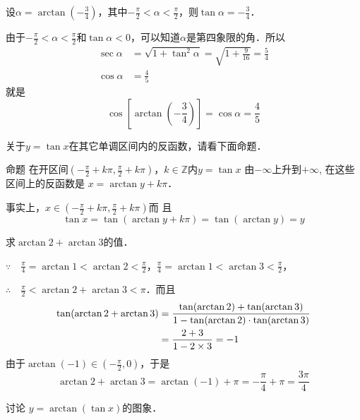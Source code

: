 \begin{solution}
设$\alpha=\arctan\left(-\frac{3}{4}\right)$，其中$-\frac{\pi}{2}<\alpha<\frac{\pi}{2}$，则$\tan\alpha=-\frac{3}{4}$．

由于$-\frac{\pi}{2}<\alpha<\frac{\pi}{2}$和$\tan\alpha<0$，可以知道$\alpha$是第四象限的角．所以
\[\begin{split}
    \sec\alpha&=\sqrt{1+\tan^2\alpha}=\sqrt{1+\frac{9}{16}}=\frac{5}{4}\\
    \cos\alpha&=\frac{4}{5}
\end{split}\]
就是
\[\cos\left[\arctan\left(-\frac{3}{4}\right)\right]=\cos\alpha=\frac{4}{5}\]
\end{solution}

关于$y=\tan x$在其它单调区间内的反函数，请看下面命题．

\begin{blk}{命题}
    在开区间$\left(-\frac{\pi}{2}+k\pi ,\frac{\pi}{2}+k\pi 
\right)$，$k\in\mathbb{Z}$内$y=\tan x$
由$-\infty$上升到$+\infty$, 在这些区间上的反函数是
$x=\arctan y+k\pi$．
\end{blk}

事实上，$x\in \left(-\frac{\pi}{2}+k\pi ,\frac{\pi}{2}+k\pi 
\right)$而
且
\[\tan x=\tan (\arctan y+k\pi )=\tan (\arctan y)=y\]




\begin{example}
    求$\arctan 2+\arctan 3$的值．
\end{example}

\begin{solution}
    $\because\quad \frac{\pi}{4}=\arctan 1<\arctan 2<\frac{\pi}{2}$，$\frac{\pi}{4}=\arctan 1<\arctan 3<\frac{\pi}{2}$，

    $\therefore\quad \frac{\pi}{2}<\arctan 2+\arctan 3<\pi$．而且
\[\begin{split}
    \tan(\arctan 2+\arctan 3)&=\dfrac{\tan (\arctan 2)+\tan (\arctan  3)}{1-\tan(\arctan 2)\cdot \tan (\arctan 3)}\\
    &=\dfrac{2+3}{1-2\times 3}=-1
\end{split}\]
由于$\arctan (-1)\in \left(-\frac{\pi}{2},0\right)$，于是
\[\arctan 2+\arctan 3=\arctan (-1)+\pi=-\frac{\pi}{4}+\pi=\frac{3\pi}{4}\]
\end{solution}

\begin{example}
    讨论 $y=\arctan (\tan x)$的图象．
\end{example}

